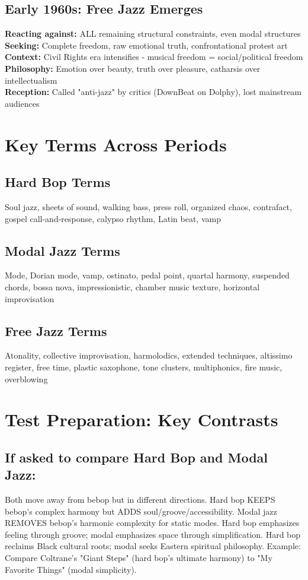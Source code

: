 \documentclass[11pt]{article}
\begin{document}
\subsection*{Early 1960s: Free Jazz Emerges}
\textbf{Reacting against:} ALL remaining structural constraints, even modal structures \\
\textbf{Seeking:} Complete freedom, raw emotional truth, confrontational protest art \\
\textbf{Context:} Civil Rights era intensifies - musical freedom = social/political freedom \\
\textbf{Philosophy:} Emotion over beauty, truth over pleasure, catharsis over intellectualism \\
\textbf{Reception:} Called "anti-jazz" by critics (DownBeat on Dolphy), lost mainstream audiences

\section*{Key Terms Across Periods}

\subsection*{Hard Bop Terms}
Soul jazz, sheets of sound, walking bass, press roll, organized chaos, contrafact, gospel call-and-response, calypso rhythm, Latin beat, vamp

\subsection*{Modal Jazz Terms}
Mode, Dorian mode, vamp, ostinato, pedal point, quartal harmony, suspended chords, bossa nova, impressionistic, chamber music texture, horizontal improvisation

\subsection*{Free Jazz Terms}
Atonality, collective improvisation, harmolodics, extended techniques, altissimo register, free time, plastic saxophone, tone clusters, multiphonics, fire music, overblowing

\section*{Test Preparation: Key Contrasts}

\subsection*{If asked to compare Hard Bop and Modal Jazz:}
Both move away from bebop but in different directions. Hard bop KEEPS bebop's complex harmony but ADDS soul/groove/accessibility. Modal jazz REMOVES bebop's harmonic complexity for static modes. Hard bop emphasizes feeling through groove; modal emphasizes space through simplification. Hard bop reclaims Black cultural roots; modal seeks Eastern spiritual philosophy. Example: Compare Coltrane's "Giant Steps" (hard bop's ultimate harmony) to "My Favorite Things" (modal simplicity).
\end{document}
